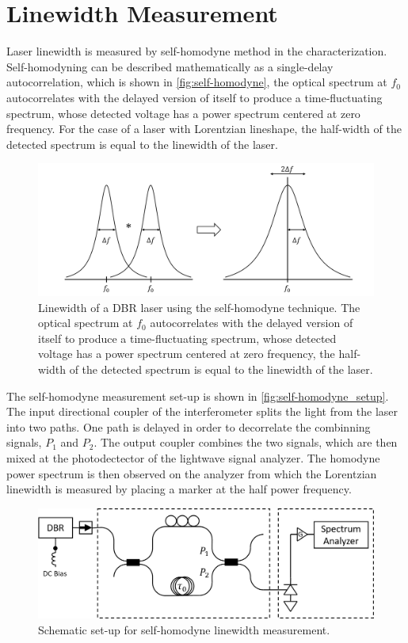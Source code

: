 \section{Linewidth Measurement}\label{sec:linewidth_measurement}
Laser linewidth is measured by self-homodyne method in the characterization. Self-homodyning can be described mathematically as a single-delay autocorrelation, which is shown in \autoref{fig:self-homodyne}, the optical spectrum at $f_0$ autocorrelates with the delayed version of itself to produce a time-fluctuating spectrum, whose detected voltage has a power spectrum centered at zero frequency. For the case of a laser with Lorentzian lineshape, the half-width of the detected spectrum is equal to the linewidth of the laser.
\begin{figure}[ht]
    \centering
    \includegraphics[width=.8\linewidth]{figures/self-homodyne.png}
    \caption{Linewidth of a DBR laser using the self-homodyne technique. The optical spectrum at $f_0$ autocorrelates with the delayed version of itself to produce a time-fluctuating spectrum, whose detected voltage has a power spectrum centered at zero frequency, the half-width of the detected spectrum is equal to the linewidth of the laser.}
    \label{fig:self-homodyne}
\end{figure}

The self-homodyne measurement set-up is shown in \autoref{fig:self-homodyne_setup}. The input directional coupler of the interferometer splits the light from the laser into two paths. One path is delayed in order to decorrelate the combinning signals, $P_1$ and $P_2$. The output coupler combines the two signals, which are then mixed at the photodectector of the lightwave signal analyzer.  The homodyne power spectrum is then observed on the analyzer from which the Lorentzian linewidth is measured by placing a marker at the half power frequency.
\begin{figure}[ht]
    \centering
    \includegraphics[width=.8\linewidth]{figures/self-homodyne_setup.png}
    \caption{Schematic set-up for self-homodyne linewidth measurement.}
    \label{fig:self-homodyne_setup}
\end{figure}


